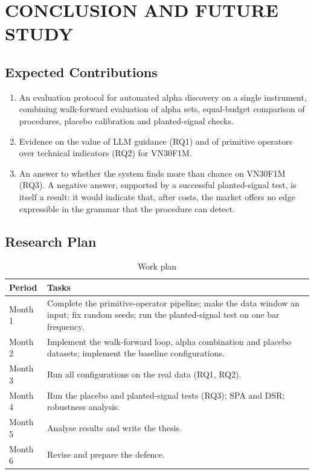 \documentclass[12pt,a4paper,oneside]{book}
\theoremstyle{definition}
\begin{document}
\chapter{CONCLUSION AND FUTURE STUDY}
\label{ch5}

\section{Expected Contributions}

\begin{enumerate}
  \item An evaluation protocol for automated alpha discovery on a single instrument, combining walk-forward evaluation of alpha sets, equal-budget comparison of procedures, placebo calibration and planted-signal checks.
  \item Evidence on the value of LLM guidance (RQ1) and of primitive operators over technical indicators (RQ2) for VN30F1M.
  \item An answer to whether the system finds more than chance on VN30F1M (RQ3). A negative answer, supported by a successful planted-signal test, is itself a result: it would indicate that, after costs, the market offers no edge expressible in the grammar that the procedure can detect.
\end{enumerate}

\section{Research Plan}

\begin{table}[H]
\centering
\caption{Work plan}
\label{tab:plan}
\begin{tabularx}{\textwidth}{lL}
\toprule
\textbf{Period} & \textbf{Tasks} \\
\midrule
Month 1 & Complete the primitive-operator pipeline; make the data window an input; fix random seeds; run the planted-signal test on one bar frequency. \\
Month 2 & Implement the walk-forward loop, alpha combination and placebo datasets; implement the baseline configurations. \\
Month 3 & Run all configurations on the real data (RQ1, RQ2). \\
Month 4 & Run the placebo and planted-signal tests (RQ3); SPA and DSR; robustness analysis. \\
Month 5 & Analyse results and write the thesis. \\
Month 6 & Revise and prepare the defence. \\
\bottomrule
\end{tabularx}
\end{table}
\end{document}
